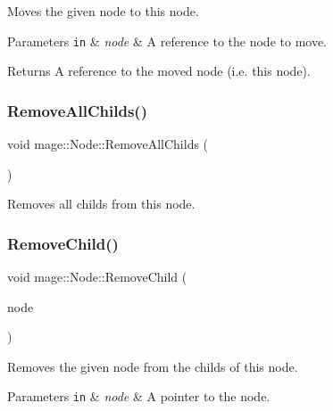 Moves the given node to this node.


\begin{DoxyParams}[1]{Parameters}
\mbox{\tt in}  & {\em node} & A reference to the node to move. \\
\hline
\end{DoxyParams}
\begin{DoxyReturn}{Returns}
A reference to the moved node (i.\+e. this node). 
\end{DoxyReturn}
\mbox{\label{classmage_1_1_node_a601804f7da1df59d5f0bd91a68dc7282}} 
\subsubsection{\texorpdfstring{Remove\+All\+Childs()}{RemoveAllChilds()}}
{\footnotesize\ttfamily void mage\+::\+Node\+::\+Remove\+All\+Childs (\begin{DoxyParamCaption}{ }\end{DoxyParamCaption})\hspace{0.3cm}{\ttfamily [noexcept]}}

Removes all childs from this node. \mbox{\label{classmage_1_1_node_a0654443d58730ebc7471626a38c2bc7f}} 
\subsubsection{\texorpdfstring{Remove\+Child()}{RemoveChild()}}
{\footnotesize\ttfamily void mage\+::\+Node\+::\+Remove\+Child (\begin{DoxyParamCaption}\item[{\mbox{\hyperlink{classmage_1_1_node_ac575dc006e0ae1134277ade977dc06b6}{Node\+Ptr}}}]{node }\end{DoxyParamCaption})}

Removes the given node from the childs of this node.


\begin{DoxyParams}[1]{Parameters}
\mbox{\tt in}  & {\em node} & A pointer to the node. \\
\hline
\end{DoxyParams}
\mbox{\label{classmage_1_1_node_aabbe500cdf7842b663bfcf034de25c5a}} 
